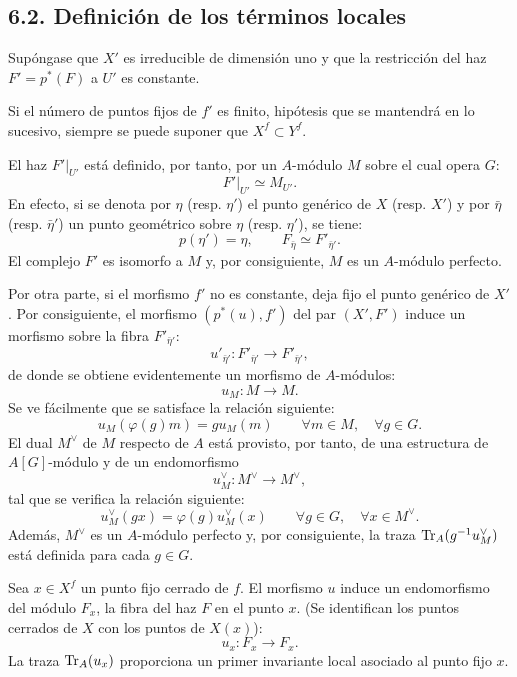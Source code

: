 \subsection*{6.2. Definición de los términos locales}
Supóngase que $X'$ es irreducible de dimensión uno y que la restricción del haz $F'=p^*(F)$ a $U'$ es constante.

Si el número de puntos fijos de $f'$ es finito, hipótesis que se mantendrá en lo sucesivo, siempre se puede suponer que $X^f \subset Y^f$.

El haz $F'|_{U'}$ está definido, por tanto, por un $A$-módulo $M$ sobre el cual opera $G$:
\[
F'|_{U'} \simeq M_{U'} .
\]
En efecto, si se denota por $\eta$ (resp. $\eta'$) el punto genérico de $X$ (resp. $X'$) y por $\bar\eta$ (resp. $\bar\eta'$) un punto geométrico sobre $\eta$ (resp. $\eta'$), se tiene:
\[
p(\eta')=\eta,\qquad F_{\bar\eta} \simeq F'_{\bar\eta'} .
\]
El complejo $F'$ es isomorfo a $M$ y, por consiguiente, $M$ es un $A$-módulo perfecto.

Por otra parte, si el morfismo $f'$ no es constante, deja fijo el punto genérico de $X'$. Por consiguiente, el morfismo $(p^*(u),f')$ del par $(X',F')$ induce un morfismo sobre la fibra $F'_{\bar\eta'}$:
\[
u'_{\bar\eta'}:F'_{\bar\eta'}\longrightarrow F'_{\bar\eta'} ,
\]
de donde se obtiene evidentemente un morfismo de $A$-módulos:
\[
u_M:M\longrightarrow M .
\]
Se ve fácilmente que se satisface la relación siguiente:
\begin{equation}\tag{6.2.1}
u_M(\varphi(g)m)=g u_M(m) \qquad \forall m\in M,\quad \forall g\in G .
\end{equation}
El dual $M^\vee$ de $M$ respecto de $A$ está provisto, por tanto, de una estructura de $A[G]$-módulo y de un endomorfismo
\[
u_M^\vee:M^\vee\longrightarrow M^\vee ,
\]
tal que se verifica la relación siguiente:
\[
u_M^\vee(gx)=\varphi(g)u_M^\vee(x) \qquad \forall g\in G,\quad \forall x\in M^\vee .
\]
Además, $M^\vee$ es un $A$-módulo perfecto y, por consiguiente, la traza $\operatorname{Tr}_A(g^{-1}u_M^\vee)$ está definida para cada $g\in G$.

Sea $x\in X^f$ un punto fijo cerrado de $f$. El morfismo $u$ induce un endomorfismo del módulo $F_x$, la fibra del haz $F$ en el punto $x$. (Se identifican los puntos cerrados de $X$ con los puntos de $X(x)$):
\[
u_x:F_x\longrightarrow F_x .
\]
La traza $\operatorname{Tr}_A(u_x)$ proporciona un primer invariante local asociado al punto fijo $x$.


